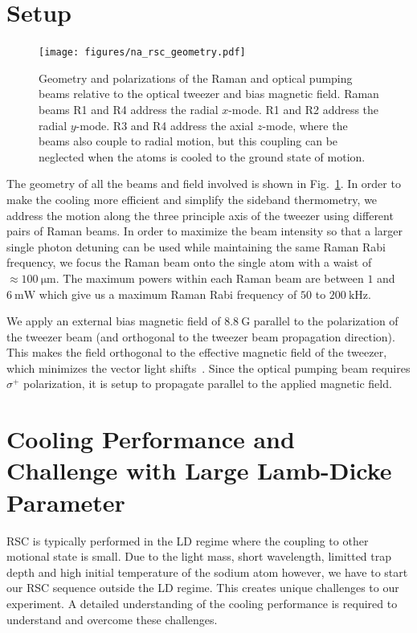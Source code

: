\section{Setup}
\label{ch:rsc:setup}

\begin{figure}
  \centering
  \texttt{[image: figures/na\_rsc\_geometry.pdf]}
  \caption[Beams and field geometry for Sodium Raman sideband cooling]{
    Geometry and polarizations of the Raman and optical pumping beams relative to the
    optical tweezer and bias magnetic field.
    Raman beams R1 and R4 address the radial $x$-mode.
    R1 and R2 address the radial $y$-mode.
    R3 and R4 address the axial $z$-mode, where the beams also couple to radial motion,
    but this coupling can be neglected when the atoms is cooled to the ground state of motion.
    \label{fig:rsc:na-geometry}}
\end{figure}

The geometry of all the beams and field involved is shown in Fig.~\ref{fig:rsc:na-geometry}.
In order to make the cooling more efficient and simplify the sideband thermometry,
we address the motion along the three principle axis of the tweezer using different pairs
of Raman beams.
In order to maximize the beam intensity so that a larger single photon detuning can be used
while maintaining the same Raman Rabi frequency,
we focus the Raman beam onto the single atom with a waist of $\approx100~\mathrm{\mu m}$.
The maximum powers within each Raman beam are between $1$ and $6~\mathrm{mW}$
which give us a maximum Raman Rabi frequency of $50$ to $200~\mathrm{kHz}$.

We apply an external bias magnetic field of $8.8~\mathrm{G}$ parallel to the polarization
of the tweezer beam (and orthogonal to the tweezer beam propagation direction).
This makes the field orthogonal to the effective magnetic field of the tweezer,
which minimizes the vector light shifts~\cite{kaufman_cooling_2012,thompson_coherence_2013}.
Since the optical pumping beam requires $\sigma^+$ polarization,
it is setup to propagate parallel to the applied magnetic field.

\section{Cooling Performance and Challenge with Large Lamb-Dicke Parameter}
\label{ch:rsc:challenges}

RSC is typically performed in the LD regime where the coupling
to other motional state is small.
Due to the light mass, short wavelength, limitted trap depth and high initial temperature
of the sodium atom however, we have to start our RSC sequence outside the LD regime.
This creates unique challenges to our experiment.
A detailed understanding of the cooling performance is required to understand
and overcome these challenges.

